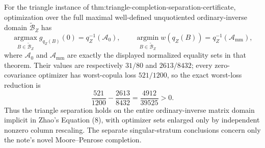 For the triangle instance of thm:triangle-completion-separation-certificate, optimization over the full maximal well-defined unquotiented ordinary-inverse domain \(\widetilde{\mathcal B}_Z\) has
\[
\operatorname*{argmax}_{B\in\widetilde{\mathcal B}_Z}g_{q_Z(B)}(0)=q_Z^{-1}(\mathcal A_0),
\qquad
\operatorname*{argmin}_{B\in\widetilde{\mathcal B}_Z}w(q_Z(B))=q_Z^{-1}(\mathcal A_{\mathrm{mm}}),
\]
where \(\mathcal A_0\) and \(\mathcal A_{\mathrm{mm}}\) are exactly the displayed normalized equality sets in that theorem.  Their values are respectively \(31/80\) and \(2613/8432\); every zero-covariance optimizer has worst-copula loss \(521/1200\), so the exact worst-loss reduction is
\[
\frac{521}{1200}-\frac{2613}{8432}=\frac{4912}{39525}>0.
\]
Thus the triangle separation holds on the entire ordinary-inverse matrix domain implicit in Zhao's Equation (8), with optimizer sets enlarged only by independent nonzero column rescaling.  The separate singular-stratum conclusions concern only the note's novel Moore--Penrose completion.